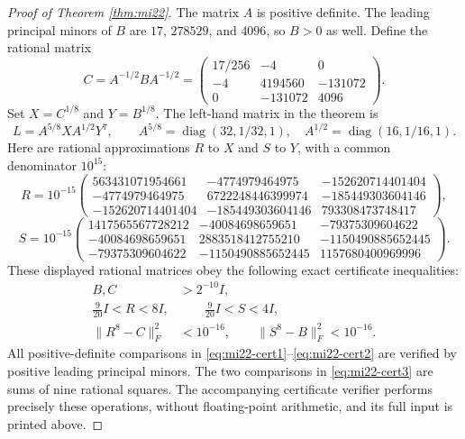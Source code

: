 \documentclass[10pt,a4paper]{article}
\theoremstyle{remark}
\newcommand{\diag}{\operatorname{diag}}
\newcommand{\norm}[1]{\lVert #1\rVert}
\begin{document}
\begin{proof}[Proof of Theorem \ref{thm:mi22}]
The matrix $A$ is positive definite. The leading principal minors of $B$ are $17$, $278529$, and $4096$, so $B>0$ as well. Define the rational matrix
\[
 C=A^{-1/2}BA^{-1/2}
 =\begin{pmatrix}
 17/256&-4&0\\-4&4194560&-131072\\0&-131072&4096
 \end{pmatrix}.
\]
Set $X=C^{1/8}$ and $Y=B^{1/8}$. The left-hand matrix in the theorem is
\[
 L=A^{5/8}XA^{1/2}Y^7,
 \qquad A^{5/8}=\diag(32,1/32,1),\quad A^{1/2}=\diag(16,1/16,1).
\]
Here are rational approximations $R$ to $X$ and $S$ to $Y$, with a common denominator $10^{15}$:
\begingroup\small
\[
 R=10^{-15}\begin{pmatrix}
 563431071954661&-4774979464975&-152620714401404\\
 -4774979464975&6722248446399974&-185449303604146\\
 -152620714401404&-185449303604146&793308473748417
 \end{pmatrix},
\]
\[
 S=10^{-15}\begin{pmatrix}
 1417565567728212&-40084698659651&-79375309604622\\
 -40084698659651&2883518412755210&-1150490885652445\\
 -79375309604622&-1150490885652445&1157680400969996
 \end{pmatrix}.
\]
\endgroup
These displayed rational matrices obey the following exact certificate inequalities:
\begin{align}
 B,C&>2^{-10}I,\label{eq:mi22-cert1}\\
 \frac9{20}I<R<8I,&\qquad \frac9{20}I<S<4I,\label{eq:mi22-cert2}\\
 \norm{R^8-C}_F^2&<10^{-16},\qquad \norm{S^8-B}_F^2<10^{-16}.\label{eq:mi22-cert3}
\end{align}
All positive-definite comparisons in \eqref{eq:mi22-cert1}--\eqref{eq:mi22-cert2} are verified by positive leading principal minors. The two comparisons in \eqref{eq:mi22-cert3} are sums of nine rational squares. The accompanying certificate verifier performs precisely these operations, without floating-point arithmetic, and its full input is printed above.


\end{proof}
\end{document}
